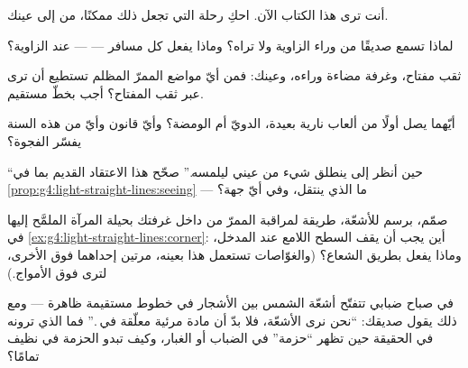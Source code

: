 \begin{exercise}[$\star$]\label{exo:g4:light-straight-lines:5}
أنت ترى هذا الكتاب الآن. احكِ رحلة  التي تجعل ذلك ممكنًا،
من  إلى عينك.
\end{exercise}

\begin{exercise}[$\star$]\label{exo:g4:light-straight-lines:6}
لماذا تسمع صديقًا من وراء الزاوية ولا تراه؟ وماذا يفعل كل
مسافر ---   --- عند الزاوية؟
\end{exercise}

\begin{exercise}[$\star$]\label{exo:g4:light-straight-lines:7}
ثقب مفتاح، وغرفة مضاءة وراءه، وعينك: فمن أيّ مواضع الممرّ
المظلم تستطيع أن ترى  عبر ثقب المفتاح؟ أجب بخطّ
مستقيم.
\end{exercise}

\begin{exercise}[$\star$]\label{exo:g4:light-straight-lines:8}
أيّهما يصل أولًا من ألعاب نارية بعيدة، الدويّ أم الومضة؟ وأيّ
قانون وأيّ  من هذه السنة يفسّر الفجوة؟
\end{exercise}

\begin{exercise}[$\star$]\label{exo:g4:light-straight-lines:9}
``حين أنظر إلى  ينطلق شيء من عيني ليلمسه.'' صحّح هذا الاعتقاد
القديم بما في \cref{prop:g4:light-straight-lines:seeing} ---
ما الذي ينتقل، وفي أيّ جهة؟
\end{exercise}

\begin{exercise}[$\star\star$]\label{exo:g4:light-straight-lines:10}
صمّم، برسم للأشعّة، طريقة لمراقبة الممرّ من داخل غرفتك بحيلة
المرآة الملمَّح إليها في
\cref{ex:g4:light-straight-lines:corner}: أين يجب أن يقف السطح
اللامع عند المدخل، وماذا يفعل بطريق الشعاع؟ (والغوّاصات تستعمل
هذا بعينه، مرتين إحداهما فوق الأخرى، لترى فوق الأمواج.)
\end{exercise}

\begin{exercise}[$\star\star$]\label{exo:g4:light-straight-lines:11}
في صباح ضبابي تتفتّح أشعّة الشمس بين الأشجار في خطوط مستقيمة
ظاهرة --- ومع ذلك يقول صديقك: ``نحن نرى الأشعّة، فلا بدّ أن
 مادة مرئية معلّقة في .'' فما الذي ترونه في الحقيقة
حين تظهر ``حزمة'' في الضباب أو الغبار، وكيف تبدو الحزمة في 
نظيف تمامًا؟
\end{exercise}
